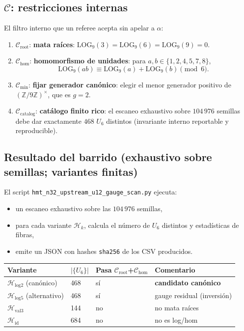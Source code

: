 \documentclass[11pt]{article}
\begin{document}
\subsection{$\mathcal C$: restricciones internas}
El filtro interno que un referee acepta sin apelar a $\alpha$:
\begin{enumerate}
  \item $\mathcal C_\mathrm{root}$: \textbf{mata ra\'ices}: $\mathrm{LOG}_9(3)=\mathrm{LOG}_9(6)=\mathrm{LOG}_9(9)=0$.
  \item $\mathcal C_\mathrm{hom}$: \textbf{homomorfismo de unidades}: para $a,b\in\{1,2,4,5,7,8\}$,
  \[\mathrm{LOG}_9(ab)\equiv \mathrm{LOG}_9(a)+\mathrm{LOG}_9(b)\pmod 6.\]
  \item $\mathcal C_\mathrm{min}$: \textbf{fijar generador can\'onico}: elegir el menor generador positivo de $(\mathbb Z/9\mathbb Z)^\times$, que es $g=2$.
  \item $\mathcal C_\mathrm{catalog}$: \textbf{cat\'alogo finito rico}: el escaneo exhaustivo sobre $104\,976$ semillas debe dar exactamente $468$ $U_6$ distintos (invariante interno reportable y reproducible).
\end{enumerate}

\subsection{Resultado del barrido (exhaustivo sobre semillas; variantes finitas)}
El script \texttt{hmt\_n32\_upstream\_u12\_gauge\_scan.py} ejecuta:
\begin{itemize}
  \item un escaneo exhaustivo sobre las $104\,976$ semillas,
  \item para cada variante $\mathcal H_k$, calcula el n\'umero de $U_6$ distintos y estad\'isticas de fibras,
  \item emite un JSON con hashes \texttt{sha256} de los CSV producidos.
\end{itemize}

\begin{longtable}{@{}llll@{}}
\toprule
Variante & $|\{U_6\}|$ & Pasa $\mathcal C_\mathrm{root}$+$\mathcal C_\mathrm{hom}$ & Comentario \\
\midrule
$\mathcal H_\mathrm{log2}$ (can\'onico) & 468 & s\'i & \textbf{candidato can\'onico} \\
$\mathcal H_\mathrm{log5}$ (alternativo) & 468 & s\'i & gauge residual (inversi\'on) \\
$\mathcal H_\mathrm{val3}$ & 144 & no & no mata ra\'ices \\
$\mathcal H_\mathrm{id}$ & 684 & no & no es log/hom \\
\bottomrule
\end{longtable}
\end{document}
